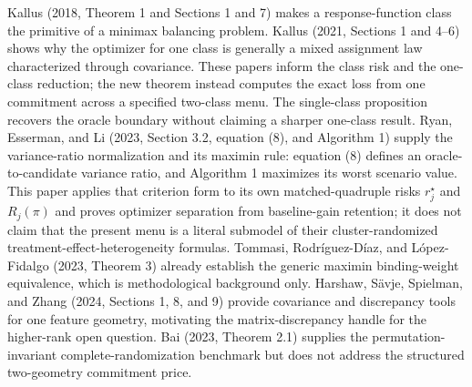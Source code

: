 Kallus (2018, Theorem 1 and Sections 1 and 7) makes a response-function class the primitive of a minimax balancing problem. Kallus (2021, Sections 1 and 4--6) shows why the optimizer for one class is generally a mixed assignment law characterized through covariance. These papers inform the class risk and the one-class reduction; the new theorem instead computes the exact loss from one commitment across a specified two-class menu. The single-class proposition recovers the oracle boundary without claiming a sharper one-class result. Ryan, Esserman, and Li (2023, Section 3.2, equation (8), and Algorithm 1) supply the variance-ratio normalization and its maximin rule: equation (8) defines an oracle-to-candidate variance ratio, and Algorithm 1 maximizes its worst scenario value. This paper applies that criterion form to its own matched-quadruple risks \(r_j^\star\) and \(R_j(\pi)\) and proves optimizer separation from baseline-gain retention; it does not claim that the present menu is a literal submodel of their cluster-randomized treatment-effect-heterogeneity formulas. Tommasi, Rodr\'iguez-D\'iaz, and L\'opez-Fidalgo (2023, Theorem 3) already establish the generic maximin binding-weight equivalence, which is methodological background only. Harshaw, S\"avje, Spielman, and Zhang (2024, Sections 1, 8, and 9) provide covariance and discrepancy tools for one feature geometry, motivating the matrix-discrepancy handle for the higher-rank open question. Bai (2023, Theorem 2.1) supplies the permutation-invariant complete-randomization benchmark but does not address the structured two-geometry commitment price.
